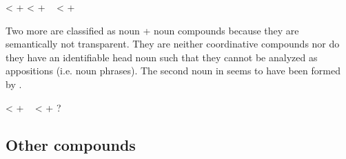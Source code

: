\begin{exe}
	\ex	\label{ex:nominalcompounds2}
	\begin{xlist}		
		\TabPositions{10em,12em}	
				\ex	{} 	\tab	<	   +  
		\ex	{} 			\tab	<	  + 
		\ex	{} 
		\sn	~\hspace*{1em}					\tab	<	  +  				
		\end{xlist}
\end{exe}

Two more  are classified as noun + noun compounds because they are semantically not transparent. They are neither coordinative compounds nor do they have an identifiable head noun such that they cannot be analyzed as appositions (i.e. noun phrases). The second noun in  seems to have been formed by .

\begin{exe}
	\ex	\label{ex:nominalcompounds3}
	\begin{xlist}	
		\TabPositions{10em,12em}		
		\ex	{} 			\tab	<	\tab	{}  +  
		\ex	\label{ex:tamaHamaPhon}  
		\sn	~\hspace*{1em}					\tab	<	\tab	{}  + ?
	\end{xlist}
\end{exe}

		
				

\subsection{Other compounds}
\label{ssec:AdjN}

